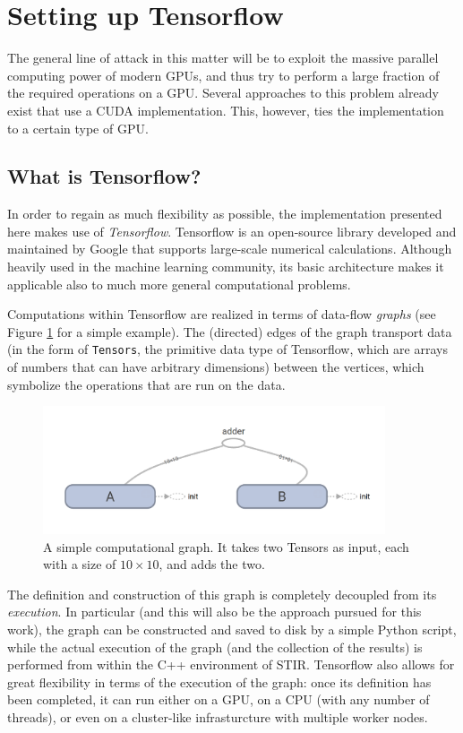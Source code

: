 \documentclass[a4paper, 11pt]{article}
\begin{document}
  \section{Setting up Tensorflow}
  The general line of attack in this matter will be to exploit the massive parallel computing power of modern GPUs, and thus try to perform a large fraction of the required operations on a GPU. Several approaches to this problem already exist that use a CUDA implementation. This, however, ties the implementation to a certain type of GPU.

  \subsection{What is Tensorflow?}
  In order to regain as much flexibility as possible, the implementation presented here makes use of \textsl{Tensorflow}. Tensorflow is an open-source library developed and maintained by Google that supports large-scale numerical calculations. Although heavily used in the machine learning community, its basic architecture makes it applicable also to much more general computational problems.

  Computations within Tensorflow are realized in terms of data-flow \textsl{graphs} (see Figure \ref{example-graph} for a simple example). The (directed) edges of the graph transport data (in the form of \texttt{Tensors}, the primitive data type of Tensorflow, which are arrays of numbers that can have arbitrary dimensions) between the vertices, which symbolize the operations that are run on the data. 
  \begin{figure}
    \centering
    \includegraphics[width = 0.9\textwidth]{../ExampleGraph.png}
    \caption{A simple computational graph. It takes two Tensors as input, each with a size of $10 \times 10$, and adds the two.}
    \label{example-graph}
  \end{figure}

  The definition and construction of this graph is completely decoupled from its \textsl{execution}. In particular (and this will also be the approach pursued for this work), the graph can be constructed and saved to disk by a simple Python script, while the actual execution of the graph (and the collection of the results) is performed from within the C++ environment of STIR. Tensorflow also allows for great flexibility in terms of the execution of the graph: once its definition has been completed, it can run either on a GPU, on a CPU (with any number of threads), or even on a cluster-like infrasturcture with multiple worker nodes.
  
\end{document}
